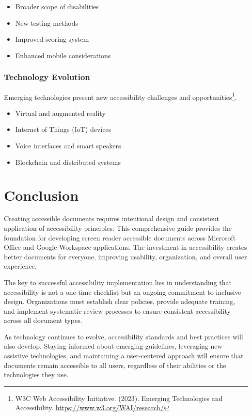 \begin{itemize}
\item Broader scope of disabilities
\item New testing methods
\item Improved scoring system
\item Enhanced mobile considerations
\end{itemize}

\subsubsection{Technology Evolution}
Emerging technologies present new accessibility challenges and opportunities\footnote{W3C Web Accessibility Initiative. (2023). Emerging Technologies and Accessibility. \url{https://www.w3.org/WAI/research/}}.

\begin{itemize}
\item Virtual and augmented reality
\item Internet of Things (IoT) devices
\item Voice interfaces and smart speakers
\item Blockchain and distributed systems
\end{itemize}

\section{Conclusion}

Creating accessible documents requires intentional design and consistent application of accessibility principles. This comprehensive guide provides the foundation for developing screen reader accessible documents across Microsoft Office and Google Workspace applications. The investment in accessibility creates better documents for everyone, improving usability, organization, and overall user experience.

The key to successful accessibility implementation lies in understanding that accessibility is not a one-time checklist but an ongoing commitment to inclusive design. Organizations must establish clear policies, provide adequate training, and implement systematic review processes to ensure consistent accessibility across all document types.

As technology continues to evolve, accessibility standards and best practices will also develop. Staying informed about emerging guidelines, leveraging new assistive technologies, and maintaining a user-centered approach will ensure that documents remain accessible to all users, regardless of their abilities or the technologies they use.

